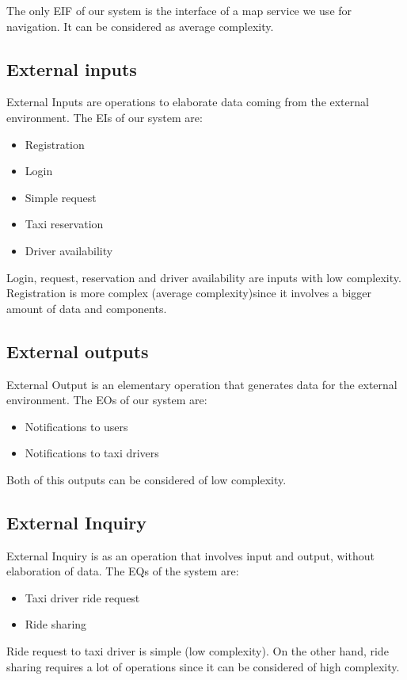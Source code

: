 The only EIF of our system is the interface of a map service we use for navigation. It can be considered as average complexity.

\subsection{External inputs}
External Inputs are operations to elaborate data coming from the external environment.
The EIs of our system are:
\begin{itemize}
	\item Registration
	\item Login
	\item Simple request
	\item Taxi reservation
	\item Driver availability
\end{itemize}
Login, request, reservation and driver availability are inputs with low complexity. Registration is more complex (average complexity)since it involves a bigger amount of data and components.

\subsection{External outputs}
External Output is an elementary operation that generates data for the external environment.
The EOs of our system are:
\begin{itemize}
	\item Notifications to users
	\item Notifications to taxi drivers
\end{itemize}
Both of this outputs can be considered of low complexity.

\subsection{External Inquiry}
External Inquiry is as an operation that involves input and output, without elaboration of data.
The EQs of the system are:
\begin{itemize}
	\item Taxi driver ride request
	\item Ride sharing
\end{itemize}
Ride request to taxi driver is simple (low complexity). On the other hand, ride sharing requires a lot of operations since it can be considered of high complexity.

